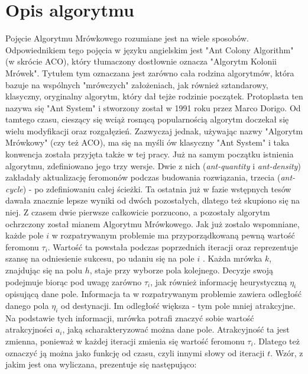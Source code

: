 \documentclass[printmode, openany, oneside, eng]{mgr}
\begin{document}
\section{Opis algorytmu}\label{sec:ralgorytmOpis}
Pojęcie Algorytmu Mrówkowego rozumiane jest na wiele sposobów. Odpowiednikiem tego pojęcia w języku angielskim jest "Ant Colony Algorithm" (w skrócie ACO), który tłumaczony dostłownie  oznacza "Algorytm Kolonii Mrówek". Tytułem tym oznaczana jest zarówno cała rodzina algorytmów, która bazuje na wspólnych "mrówczych" założeniach, jak również sztandarowy, klasyczny, oryginalny algorytm, który dał tejże rodzinie początek. Protoplasta ten nazywa się "Ant System" i stworzony został w 1991 roku przez Marco Dorigo. Od tamtego czasu, cieszący się wciąż rosnącą popularnością algorytm doczekał się wielu modyfikacji oraz rozgałęzień. Zazwyczaj jednak, używając nazwy "Algorytm Mrówkowy" (czy też ACO), ma się na myśli ów klasyczny "Ant System" i taka konwencja została przyjęta także w tej pracy.
\newline Już na samym początku istnienia algorytmu, zdefiniowano jego trzy wersje. Dwie z nich (\textit{ant-quantity} i \textit{ant-density}) zakładały aktualizację feromonów podczas budowania rozwiązania, trzecia (\textit{ant-cycle}) - po zdefiniowaniu całej ścieżki. Ta ostatnia już w fazie wstępnych tesów dawała znacznie lepsze wyniki od dwóch pozostałych, dlatego też skupiono się na niej. Z czasem dwie pierwsze całkowicie porzucono, a pozostały algorytm ochrzczony został mianem Algorytmu Mrówkowego.
\newline Jak już zostalo wspomniane, każde pole $i$ w rozpatrywanym problemie ma przyporządkowaną pewną wartość feromonu $\tau _{i}$. Wartość ta powstała podczas poprzednich iteracji oraz reprezentuje szansę na odniesienie sukcesu, po udaniu się na pole $i$ . Każda mrówka $k$, znajdując się na polu $h$, staje przy wyborze pola kolejnego. Decyzje swoją podejmuje biorąc pod uwagę zarówno $\tau_{i}$, jak również informację heurystyczną $\eta _{i}$ opisującą dane pole. Informacja ta w rozpatrywanym problemie zawiera odległość danego pola $\eta_{i}$ od destynacji. Im odległość większa - tym pole mniej atrakcyjne. Na podstawie tych informacji, mrówka potrafi znaczyć sobie wartość atrakcyjności $a_{i}$, jaką scharakteryzować można dane pole. Atrakcyjność ta jest zmienna, ponieważ w każdej iteracji zmienia się wartość feromonu $\tau_{i}$. Dlatego też oznaczyć ją można jako funkcję od czasu, czyli innymi słowy od iteracji $t$.  Wzór, z jakim jest ona wyliczana, prezentuje się następująco:
\newline
\end{document}
